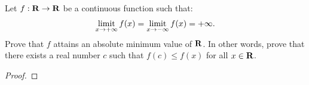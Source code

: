 \documentclass[11pt,twoside,openany]{memoir}
\begin{document}
\newpage
\fancyhead[L]{\scalebox{0.9}{Continuity}}
\fancyhead[R]{\scalebox{0.9}{Appeared on: F15}}
\begin{problem}
    Let $f:\mathbf{R} \rightarrow \mathbf{R}$ be a continuous function such that:
        \begin{equation*}
        \begin{split}
            \operatorname*{limit}_{x \rightarrow +\infty}f(x) = \operatorname*{limit}_{x \rightarrow -\infty}f(x) = +\infty.
        \end{split}
        \end{equation*}
    Prove that $f$ attains an absolute minimum value of $\mathbf{R}$. In other words, prove that there exists a real number $c$ such that $f(c) \leq f(x)$ for all $x \in \mathbf{R}$.
\end{problem}
\begin{proof}
\end{proof}
\end{document}
